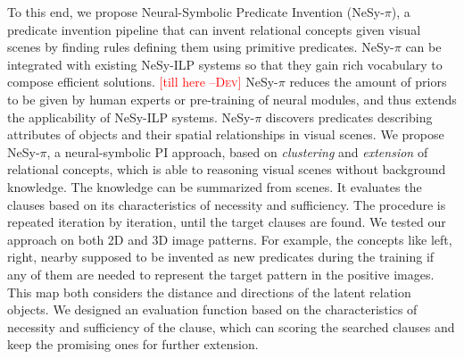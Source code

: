 \documentclass[
]{ceurart}
\newcommand{\dd}[1]{\textcolor{red}{[#1 \textsc{--Dev}]}}
\begin{document}
	To this end, we propose Neural-Symbolic Predicate Invention (NeSy-$\pi$), a predicate invention pipeline that can invent relational concepts given visual scenes by finding rules defining them using primitive predicates.
	NeSy-$\pi$ can be integrated with existing NeSy-ILP systems so that they gain rich vocabulary to compose efficient solutions. \dd{till here}
	NeSy-$\pi$ reduces the amount of priors to be given by human experts or pre-training of neural modules, and thus extends the applicability of NeSy-ILP systems.
	NeSy-$\pi$ discovers predicates describing attributes of objects and their spatial relationships in visual scenes.
	We propose NeSy-$\pi$, a neural-symbolic PI approach, based on \textit{clustering} and \textit{extension} of relational concepts, which is able to reasoning visual scenes without background knowledge. The knowledge can be summarized from scenes. It evaluates the clauses based on its characteristics of necessity and sufficiency. The procedure is repeated iteration by iteration, until the target clauses are found. We tested our approach on both 2D and 3D image patterns.
	For example, the concepts like left, right, nearby supposed to be invented as new predicates during the training if any of them are needed to represent the target pattern in the positive images.  This map both considers the distance and directions of the latent relation objects. 
	We designed an evaluation function based on the characteristics of necessity and sufficiency of the clause, which can scoring the searched clauses and keep the promising ones for further extension.
	
\end{document}

